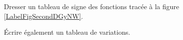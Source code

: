 
\begin{exercice}\label{exoPremiere-0060}

Dresser un tableau de signe des fonctions tracée à la figure \ref{LabelFigSecondDGyNW}.
\newcommand{\CaptionFigSecondDGyNW}{Les graphes de l'exercice \ref{exoPremiere-0060}}

Écrire également un tableau de variations.

\end{exercice}
